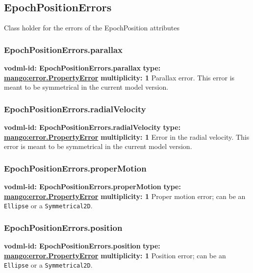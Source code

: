   \subsection{EpochPositionErrors}
  \label{sect:EpochPositionErrors}
    Class holder for the errors of the EpochPosition attributes

    \subsubsection{EpochPositionErrors.parallax}
      \textbf{vodml-id: EpochPositionErrors.parallax} \newline
      \textbf{type: \hyperref[sect:error.PropertyError]{mango:error.PropertyError}} \newline
      \textbf{multiplicity: 1} \newline
      Parallax error. This error is meant to be symmetrical in the current model version.

    \subsubsection{EpochPositionErrors.radialVelocity}
      \textbf{vodml-id: EpochPositionErrors.radialVelocity} \newline
      \textbf{type: \hyperref[sect:error.PropertyError]{mango:error.PropertyError}} \newline
      \textbf{multiplicity: 1} \newline
      Error in the radial velocity. This error is meant to be symmetrical in the current model version.

    \subsubsection{EpochPositionErrors.properMotion}
      \textbf{vodml-id: EpochPositionErrors.properMotion} \newline
      \textbf{type: \hyperref[sect:error.PropertyError]{mango:error.PropertyError}} \newline
      \textbf{multiplicity: 1} \newline
      Proper motion error; can be an \texttt{Ellipse} or a \texttt{Symmetrical2D}.

    \subsubsection{EpochPositionErrors.position}
      \textbf{vodml-id: EpochPositionErrors.position} \newline
      \textbf{type: \hyperref[sect:error.PropertyError]{mango:error.PropertyError}} \newline
      \textbf{multiplicity: 1} \newline
      Position error; can be an \texttt{Ellipse} or a \texttt{Symmetrical2D}.

